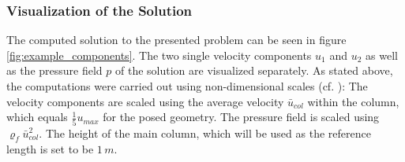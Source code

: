 \documentclass{article}
\begin{document}
\subsubsection{Visualization of the Solution}
\label{sec:example:subsec:visu}

The computed solution to the presented problem can be seen in figure \ref{fig:example_components}. The two single velocity components $u_1$ and $u_2$ as well as the pressure field $p$ of the solution are visualized separately. As stated above, the computations were carried out using non-dimensional scales (cf. \cite[sec. 3.6]{Blunck}): The velocity components are scaled using the average velocity $\bar u_{col}$ within the column, which equals $\frac{1}{5}u_{max}$ for the posed geometry. The pressure field is scaled using $\varrho_f \bar u_{col}^2$. The height of the main column, which will be used as the reference length is set to be $1\,m$. 
\end{document}
